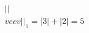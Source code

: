 \documentclass[preview]{standalone}
\begin{document}
\begin{align*}
||\\vec{v}||_1 = |3| + |2| = 5
\end{align*}
\end{document}
